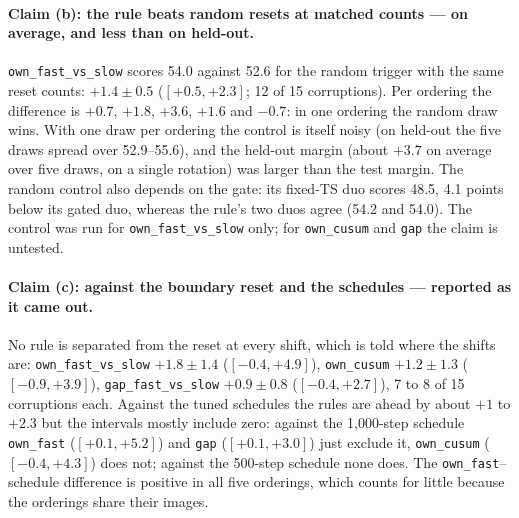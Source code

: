 \documentclass[10pt]{article}
\newcommand{\rl}[1]{\texttt{#1}}
\begin{document}
\paragraph{Claim (b): the rule beats random resets at matched counts --- on average, and less than on held-out.} \rl{own\_fast\_vs\_slow} scores 54.0 against 52.6 for the random trigger with the same reset counts: $+1.4 \pm 0.5$ ($[+0.5, +2.3]$; 12 of 15 corruptions). Per ordering the difference is $+0.7$, $+1.8$, $+3.6$, $+1.6$ and $-0.7$: in one ordering the random draw wins. With one draw per ordering the control is itself noisy (on held-out the five draws spread over 52.9--55.6), and the held-out margin (about $+3.7$ on average over five draws, on a single rotation) was larger than the test margin. The random control also depends on the gate: its fixed-TS duo scores 48.5, 4.1 points below its gated duo, whereas the rule's two duos agree (54.2 and 54.0). The control was run for \rl{own\_fast\_vs\_slow} only; for \rl{own\_cusum} and \rl{gap} the claim is untested.

\paragraph{Claim (c): against the boundary reset and the schedules --- reported as it came out.} No rule is separated from the reset at every shift, which is told where the shifts are: \rl{own\_fast\_vs\_slow} $+1.8 \pm 1.4$ ($[-0.4, +4.9]$), \rl{own\_cusum} $+1.2 \pm 1.3$ ($[-0.9, +3.9]$), \rl{gap\_fast\_vs\_slow} $+0.9 \pm 0.8$ ($[-0.4, +2.7]$), 7 to 8 of 15 corruptions each. Against the tuned schedules the rules are ahead by about $+1$ to $+2.3$ but the intervals mostly include zero: against the 1,000-step schedule \rl{own\_fast} ($[+0.1, +5.2]$) and \rl{gap} ($[+0.1, +3.0]$) just exclude it, \rl{own\_cusum} ($[-0.4, +4.3]$) does not; against the 500-step schedule none does. The \rl{own\_fast}--schedule difference is positive in all five orderings, which counts for little because the orderings share their images.
\end{document}

